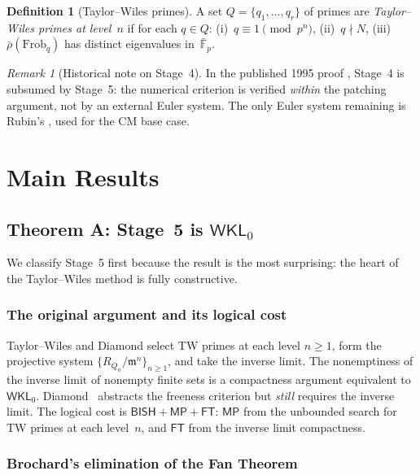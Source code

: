 \documentclass[11pt]{article}
\theoremstyle{plain}
\theoremstyle{definition}
\newtheorem{definition}[theorem]{Definition}
\theoremstyle{remark}
\newtheorem{remark}[theorem]{Remark}
\newcommand{\F}{\mathbb{F}}
\newcommand{\fm}{\mathfrak{m}}
\newcommand{\Frob}{\mathrm{Frob}}
\newcommand{\BISH}{\mathsf{BISH}}
\newcommand{\MP}{\mathsf{MP}}
\newcommand{\FT}{\mathsf{FT}}
\newcommand{\WKL}{\mathsf{WKL}_0}
\begin{document}
\begin{definition}[Taylor--Wiles primes]\label{def:tw}
A set $Q = \{q_1, \ldots, q_r\}$ of primes are \emph{Taylor--Wiles
primes at level~$n$} if for each $q \in Q$:
(i)~$q \equiv 1 \pmod{p^n}$,
(ii)~$q \nmid N$,
(iii)~$\bar{\rho}(\Frob_q)$ has distinct eigenvalues
in~$\bar{\F}_p$.
\end{definition}

\begin{remark}[Historical note on Stage~4]\label{rem:stage4}
In the published 1995 proof \cite{Wiles1995}, Stage~4 is subsumed
by Stage~5: the numerical criterion is verified \emph{within} the
patching argument, not by an external Euler system.  The only Euler
system remaining is Rubin's \cite{Rubin1991}, used for the CM base
case.
\end{remark}


\section{Main Results}\label{sec:main}

\subsection{Theorem A: Stage~5 is \texorpdfstring{$\WKL$}{WKL}}\label{sec:stage5}

We classify Stage~5 first because the result is the most
surprising: the heart of the Taylor--Wiles method is fully
constructive.

\subsubsection{The original argument and its logical cost}

Taylor--Wiles \cite{TaylorWiles1995} and Diamond \cite{Diamond1997}
select TW primes at each level $n \ge 1$, form the projective
system $\{R_{Q_n} / \fm^n\}_{n \ge 1}$, and take the inverse limit.
The nonemptiness of the inverse limit of nonempty finite sets is a
compactness argument equivalent to $\WKL$.
Diamond~\cite{Diamond1997} abstracts the freeness criterion but
\emph{still} requires the inverse limit.
The logical cost is $\BISH + \MP + \FT$:
$\MP$ from the unbounded search for TW primes at each level~$n$,
and $\FT$ from the inverse limit compactness.

\subsubsection{Brochard's elimination of the Fan Theorem}
\end{document}
